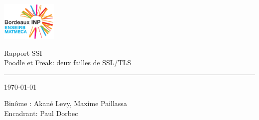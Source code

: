 \documentclass[a4paper,11pts]{article}
\begin{document}
\begin{center}

\includegraphics[width=100px]{img/enseirb-matmeca}

\Huge{Rapport SSI} \\
\Huge{Poodle et Freak: deux failles de SSL/TLS}
\noindent\rule{10cm}{0.4pt}

\normalsize{\today}

\vspace{1cm}

\Large{Bin\^ome : Akané Levy, Maxime Paillassa}\\
\Large{Encadrant: Paul Dorbec}

\end{center}

\clearpage



\newpage

\tableofcontents

\newpage



%
%



\end{document}
